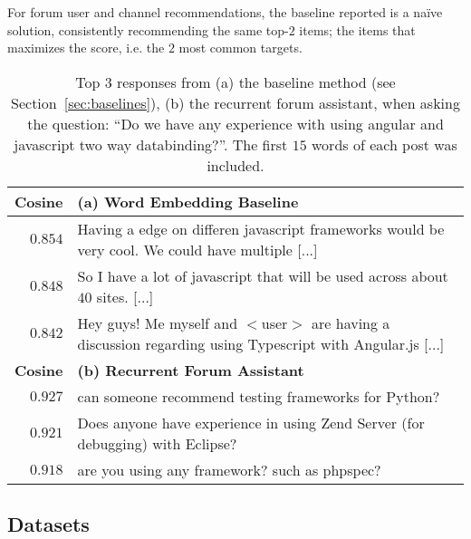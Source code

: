 \documentclass[11pt]{article}
\begin{document}
For forum user and channel recommendations, the baseline reported is a na\"{i}ve solution, consistently recommending the same top-$2$ items; the items that maximizes the score, i.e. the $2$ most common targets.

\begin{table*}[t]
\centering
\begin{tabularx}{\linewidth}{rX}
\textbf{Cosine} & \textbf{(a) Word Embedding Baseline} \\
\midrule
$0.854$ & Having a edge on differen javascript frameworks would be very cool. We could have multiple [...] \\
$0.848$ & So I have a lot of javascript that will be used across about $40$ sites. [...] \\
$0.842$ & Hey guys! Me myself and $<$user$>$ are having a discussion regarding using Typescript with Angular.js [...] \vspace{1em} \\

\textbf{Cosine} & \textbf{(b) Recurrent Forum Assistant} \\

\midrule

$0.927$ & can someone recommend testing frameworks for Python? \\
$0.921$ & Does anyone have experience in using Zend Server (for debugging) with Eclipse? \\
$0.918$ & are you using any framework? such as phpspec?  \vspace{1em} \\
\end{tabularx}
\caption{Top 3 responses from (a) the baseline method (see Section~\ref{sec:baselines}), (b) the recurrent forum assistant, when asking the question: ``Do we have any experience with using angular and javascript two way databinding?''. The first $15$ words of each post was included.
\vspace{1em}
}
\label{tab:post-recommendation-examples-short}
\end{table*}

\vspace{3em}

\subsection{Datasets}
\label{sec:datasets}

\end{document}
